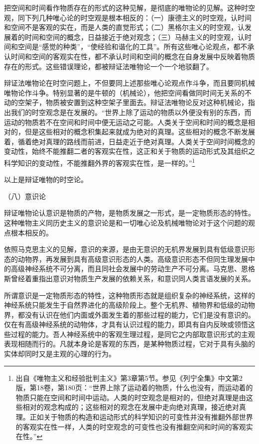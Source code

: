 \documentclass[UTF8, 12pt, a4paper]{ctexrep}
\begin{document}
把空间和时间看作物质存在的形式的这种见解，是彻底的唯物论的见解。这种时空观，同下列几种唯心论的时空观是根本相反的：（一）康德主义的时空观，认时间和空间不是客观的实在，而是人类的直觉形式；（二）黑格尔主义的时空观，认发展着的时间和空间的概念，日益接近于绝对观念；（三）马赫主义的时空观，认时间和空间是“感觉的种类”，“使经验和谐化的工具”。所有这些唯心论观点，都不承认时间和空间的客观实在性，都不承认时间和空间的概念在自身发展中反映着物质存在的形式。这些错误理论，都被辩证法唯物论一个一个地驳翻了。

辩证法唯物论在时空问题上，不但要同上述那些唯心论观点作斗争，而且要同机械唯物论作斗争。特别显著的是牛顿的（机械论），他把空间看做同时间无关系的不动的空架子，物质被安置到这种空架子里面去。辩证法唯物论反对这种机械论，指出我们的时空观念是在发展的。“世界上除了运动的物质以外便没有别的东西，而运动的物质若不在空间和时间中便无运动之可能。人类关于空间和时间的概念是相对的，但是这些相对的概念积集起来就成为绝对的真理。这些相对的概念不断发展着，循着绝对真理的路线而前进，日益走近于绝对真理。人类关于空间时间概念的变动性，始终不能推翻二者的客观实在性，这正和关于物质的运动形式及其组织之科学知识的变动性，不能推翻外界的客观实在性，是一样的。”\footnote{出自《唯物主义和经验批判主义》第3章第5节。参见《列宁全集》中文第2版，第18卷，第180页：“世界上除了运动着的物质，什么也没有，而运动着的物质只能在空间和时间中运动。人类的时空观念是相对的，但绝对真理是由这些相对的观念构成的；这些相对的观念在发展中走向绝对真理，接近绝对真理。正如关于物质的构造和运动形式的科学知识的可变性并没有推翻外部世界的客观实在性一样，人类的时空观念的可变性也没有推翻空间和时间的客观实在性。”}

以上是辩证唯物的时空论。

（八）意识论

辩证唯物论认意识是物质的产物，是物质发展之一形式，是一定物质形态的特性。这种唯物主义同历史主义的意识论是和一切唯心论及机械唯物论对于这个问题的观点根本相反的。

依照马克思主义的见解，意识的来源，是由无意识的无机界发展到具有低级意识形态的动物界，再发展到具有高级意识形态的人类。高级意识形态不但同生理发展中的高级神经系统不可分离，而且同社会发展中的劳动生产不可分离。马克思、恩格斯曾经着重指出意识对物质生产发展的依赖关系，和意识同人类言语发展的关系。

所谓意识是一定物质形态的特性，这种物质形态就是组织复杂的神经系统，这样的神经系统只能发生于自然界进化的高级阶段上。整个无机界、植物界和低级的动物界，都没有认识在他们内面或外面发生着的那些过程的能力，它们是没有意识的。仅在有高级神经系统的动物体，才具有认识过程的能力，即具有自内反映或领悟这些过程的能力。吾人神经系统中的客观生理过程，是同它之内部取意识形式的主观表现相随而行的。凡就本身论是客观的东西，是某种物质过程，它对于具有头脑的实体却同时又是主观的心理的行为。
\end{document}
